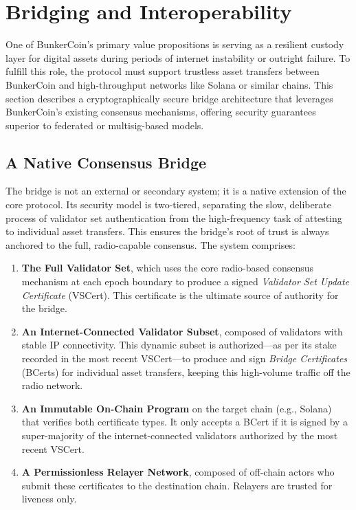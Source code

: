 \documentclass{article}
\begin{document}
\section{Bridging and Interoperability}
\label{sec:bridge}

One of BunkerCoin's primary value propositions is serving as a resilient custody layer for digital assets during periods of internet instability or outright failure. To fulfill this role, the protocol must support trustless asset transfers between BunkerCoin and high-throughput networks like Solana or similar chains. This section describes a cryptographically secure bridge architecture that leverages BunkerCoin's existing consensus mechanisms, offering security guarantees superior to federated or multisig-based models.

\subsection{A Native Consensus Bridge}

The bridge is not an external or secondary system; it is a native extension of the core protocol. Its security model is two-tiered, separating the slow, deliberate process of validator set authentication from the high-frequency task of attesting to individual asset transfers. This ensures the bridge's root of trust is always anchored to the full, radio-capable consensus. The system comprises:

\begin{enumerate}
    \item \textbf{The Full Validator Set}, which uses the core radio-based consensus mechanism at each epoch boundary to produce a signed \emph{Validator Set Update Certificate} (VSCert). This certificate is the ultimate source of authority for the bridge.
    \item \textbf{An Internet-Connected Validator Subset}, composed of validators with stable IP connectivity. This dynamic subset is authorized---as per its stake recorded in the most recent VSCert---to produce and sign \emph{Bridge Certificates} (BCerts) for individual asset transfers, keeping this high-volume traffic off the radio network.
    \item \textbf{An Immutable On-Chain Program} on the target chain (e.g., Solana) that verifies both certificate types. It only accepts a BCert if it is signed by a super-majority of the internet-connected validators authorized by the most recent VSCert.
    \item \textbf{A Permissionless Relayer Network}, composed of off-chain actors who submit these certificates to the destination chain. Relayers are trusted for liveness only.
\end{enumerate}
\end{document}

